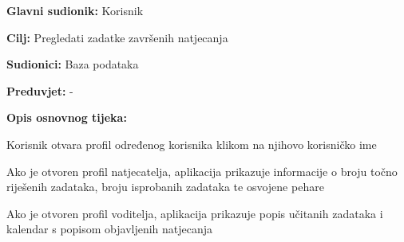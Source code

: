 					
					\noindent {}
					\begin{packed_item}
						
						\item \textbf{Glavni sudionik: }Korisnik
						\item \textbf{Cilj:} Pregledati zadatke završenih natjecanja
						\item \textbf{Sudionici:} Baza podataka
						\item \textbf{Preduvjet:} -
						\item \textbf{Opis osnovnog tijeka:}
						
						\item[] \begin{packed_enum}
							\item Korisnik otvara profil određenog korisnika klikom na njihovo korisničko ime
							\item Ako je otvoren profil natjecatelja, aplikacija prikazuje informacije o broju točno riješenih zadataka, broju isprobanih zadataka te osvojene pehare
							\item Ako je otvoren profil voditelja, aplikacija prikazuje popis učitanih zadataka i kalendar s popisom objavljenih natjecanja
						\end{packed_enum}
					\end{packed_item}
					
					
					
